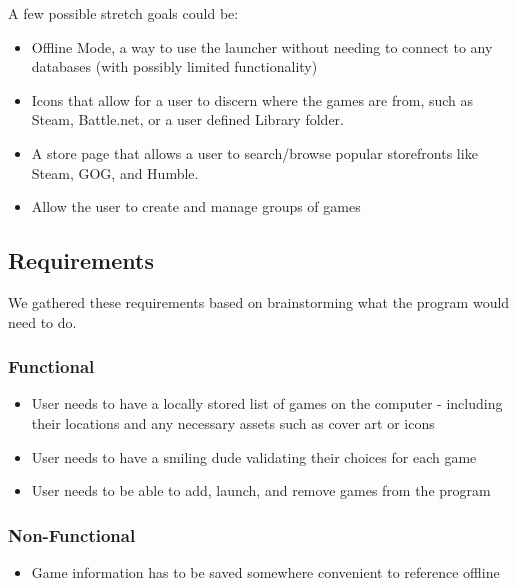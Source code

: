 \documentclass[10pt,conference,onecolumn,compsoc]{IEEEtran}
\begin{document}
A few possible stretch goals could be:

\begin{itemize}
\item Offline Mode, a way to use the launcher without needing to connect to any databases (with possibly limited functionality)
\item Icons that allow for a user to discern where the games are from, such as Steam, Battle.net, or a user defined Library folder.
\item A store page that allows a user to search/browse popular storefronts like Steam, GOG, and Humble.
\item Allow the user to create and manage groups of games
\end{itemize}

\subsection{Requirements}
We gathered these requirements based on brainstorming what the program would need to do.

\subsubsection{Functional}

\begin{itemize}
\item User needs to have a locally stored list of games on the computer - including their locations and any necessary assets such as cover art or icons
\item User needs to have a smiling dude validating their choices for each game
\item User needs to be able to add, launch, and remove games from the program
\end{itemize}

\subsubsection{Non-Functional}

\begin{itemize}
\item Game information has to be saved somewhere convenient to reference offline 
\end{itemize}
\end{document}
